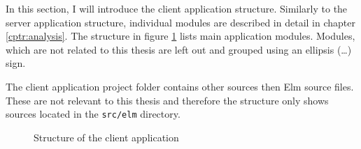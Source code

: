 In this section, I will introduce the client application structure.
Similarly to the server application structure, individual modules are described in detail in chapter \ref{cptr:analysis}.
The structure in figure \ref{fig:client-structure} lists main application modules.
Modules, which are not related to this thesis are left out and grouped using an ellipsis (\dots) sign.

The client application project folder contains other sources then Elm source files.
These are not relevant to this thesis and therefore the structure only shows sources located in the \texttt{src/elm} directory.

\begin{figure}[H]
    \caption{Structure of the client application}\label{fig:client-structure}
\end{figure}
